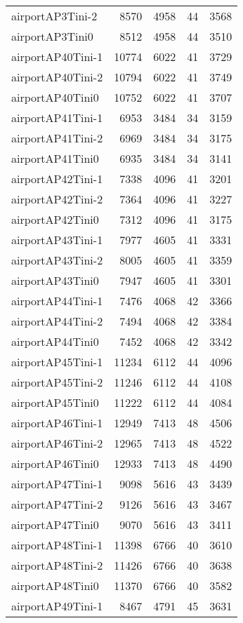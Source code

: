 \begin{longtable}{lrrrr}
airportAP3Tini-2 & 8570 & 4958 & 44 & 3568 \\
airportAP3Tini0 & 8512 & 4958 & 44 & 3510 \\
airportAP40Tini-1 & 10774 & 6022 & 41 & 3729 \\
airportAP40Tini-2 & 10794 & 6022 & 41 & 3749 \\
airportAP40Tini0 & 10752 & 6022 & 41 & 3707 \\
airportAP41Tini-1 & 6953 & 3484 & 34 & 3159 \\
airportAP41Tini-2 & 6969 & 3484 & 34 & 3175 \\
airportAP41Tini0 & 6935 & 3484 & 34 & 3141 \\
airportAP42Tini-1 & 7338 & 4096 & 41 & 3201 \\
airportAP42Tini-2 & 7364 & 4096 & 41 & 3227 \\
airportAP42Tini0 & 7312 & 4096 & 41 & 3175 \\
airportAP43Tini-1 & 7977 & 4605 & 41 & 3331 \\
airportAP43Tini-2 & 8005 & 4605 & 41 & 3359 \\
airportAP43Tini0 & 7947 & 4605 & 41 & 3301 \\
airportAP44Tini-1 & 7476 & 4068 & 42 & 3366 \\
airportAP44Tini-2 & 7494 & 4068 & 42 & 3384 \\
airportAP44Tini0 & 7452 & 4068 & 42 & 3342 \\
airportAP45Tini-1 & 11234 & 6112 & 44 & 4096 \\
airportAP45Tini-2 & 11246 & 6112 & 44 & 4108 \\
airportAP45Tini0 & 11222 & 6112 & 44 & 4084 \\
airportAP46Tini-1 & 12949 & 7413 & 48 & 4506 \\
airportAP46Tini-2 & 12965 & 7413 & 48 & 4522 \\
airportAP46Tini0 & 12933 & 7413 & 48 & 4490 \\
airportAP47Tini-1 & 9098 & 5616 & 43 & 3439 \\
airportAP47Tini-2 & 9126 & 5616 & 43 & 3467 \\
airportAP47Tini0 & 9070 & 5616 & 43 & 3411 \\
airportAP48Tini-1 & 11398 & 6766 & 40 & 3610 \\
airportAP48Tini-2 & 11426 & 6766 & 40 & 3638 \\
airportAP48Tini0 & 11370 & 6766 & 40 & 3582 \\
airportAP49Tini-1 & 8467 & 4791 & 45 & 3631 \\

\end{longtable}
